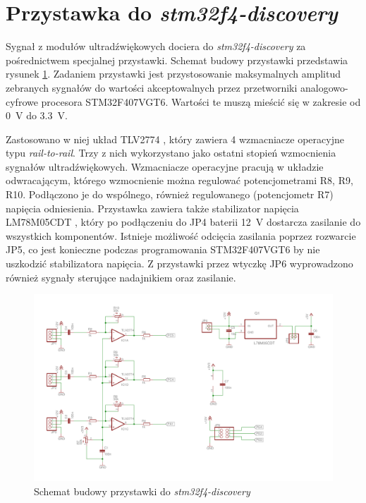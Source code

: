 \section{Przystawka do \textit{stm32f4-discovery}}

Sygnał z modułów ultradźwiękowych dociera do \textit{stm32f4-discovery} za pośrednictwem specjalnej przystawki.
Schemat budowy przystawki przedstawia rysunek \ref{fig:przystawka}.
Zadaniem przystawki jest przystosowanie maksymalnych amplitud zebranych sygnałów do wartości akceptowalnych przez  
przetworniki analogowo-cyfrowe procesora STM32F407VGT6.
Wartości te muszą mieścić się w zakresie od \SI{0}{V} do \SI{3,3}{V}.

Zastosowano w niej układ TLV2774 \cite{bib:TLV2774}, który zawiera 4 wzmacniacze operacyjne typu
\textit{rail-to-rail}. Trzy z nich wykorzystano jako ostatni stopień wzmocnienia sygnałów ultradźwiękowych. 
Wzmacniacze operacyjne pracują w układzie odwracającym, którego wzmocnienie można regulować potencjometrami R8, R9, R10. 
Podłączono je do wspólnego, również regulowanego (potencjometr R7) napięcia odniesienia.
Przystawka zawiera także stabilizator napięcia LM78M05CDT \cite{bib:LM78M05CDT}, który po podłączeniu 
do JP4 baterii \SI{12}{V} dostarcza zasilanie do wszystkich komponentów. 
Istnieje możliwość odcięcia zasilania poprzez rozwarcie JP5, co jest konieczne podczas programowania
STM32F407VGT6 by nie uszkodzić stabilizatora napięcia.
Z przystawki przez wtyczkę JP6 wyprowadzono również sygnały sterujące nadajnikiem oraz zasilanie.

 \begin{figure}[h]
    \centering
    \includegraphics[width=1\textwidth, trim= 5mm 0mm 0mm 0mm,clip]{mainboard2}
    \caption{Schemat budowy przystawki do \textit{stm32f4-discovery}}
    \label{fig:przystawka}
\end{figure}


